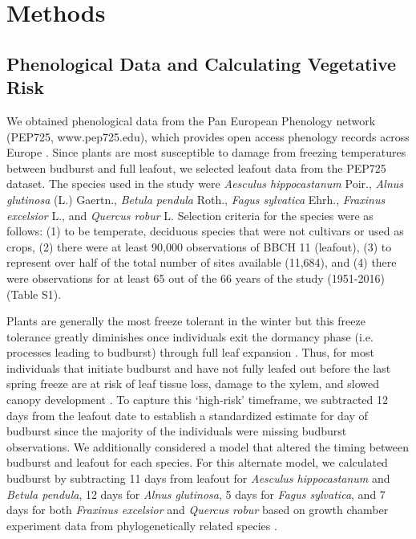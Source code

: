 \documentclass{article}\usepackage[]{graphicx}\usepackage[]{color}
\begin{document}
\section*{Methods} 
\subsection*{Phenological Data and Calculating Vegetative Risk}
We obtained phenological data from the Pan European Phenology network (PEP725, www.pep725.edu), which provides open access phenology records across Europe \citep{Templ2018}. Since plants are most susceptible to damage from freezing temperatures between budburst and full leafout, we selected leafout data \citep[i.e., in][BBCH 11, which is defined as the point of leaf unfolding and the first visible leaf stalk]{Meier2001} from the PEP725 dataset. The species used in the study were \textit{Aesculus hippocastanum} Poir., \textit{Alnus glutinosa} (L.) Gaertn., \textit{Betula pendula} Roth., \textit{Fagus sylvatica} Ehrh., \textit{Fraxinus excelsior} L., and \textit{Quercus robur} L. Selection criteria for the species were as follows: (1) to be temperate, deciduous species that were not cultivars or used as crops, (2) there were at least 90,000 observations of BBCH 11 (leafout), (3) to represent over half of the total number of sites available (11,684), and (4) there were observations for at least 65 out of the 66 years of the study (1951-2016) (Table S1). 

Plants are generally the most freeze tolerant in the winter but this freeze tolerance greatly diminishes once individuals exit the dormancy phase (i.e. processes leading to budburst) through full leaf expansion \citep{Lenz2016, Vitasse2014}. Thus, for most individuals that initiate budburst and have not fully leafed out before the last spring freeze are at risk of leaf tissue loss, damage to the xylem, and slowed canopy development \citep{Gu2008, Hufkens2012}. To capture this `high-risk' timeframe, we subtracted 12 days from the leafout date to establish a standardized estimate for day of budburst \citep{Donnelly2017, Flynn2018, NPN2019} since the majority of the individuals were missing budburst observations. 
We additionally considered a model that altered the timing between budburst and leafout for each species. For this alternate model, we calculated budburst by subtracting 11 days from leafout for \textit{Aesculus hippocastanum} and \textit{Betula pendula}, 12 days for \textit{Alnus glutinosa}, 5 days for \textit{Fagus sylvatica}, and 7 days for both \textit{Fraxinus excelsior} and \textit{Quercus robur} based on growth chamber experiment data from phylogenetically related species \citep{Buerki2010, Wang2016, Hipp2017, Flynn2018}.
\end{document}
